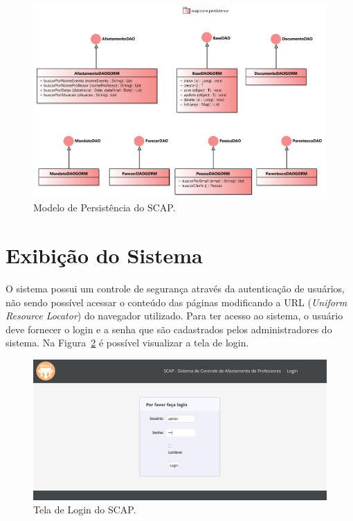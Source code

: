 \begin{figure}[!h]
	\centering
	\includegraphics[scale=0.45]{figuras/fig-projeto-persistencia} 
	\caption{Modelo de Persistência do SCAP.}
	\label{fig-projeto-persistencia}
\end{figure}

\section{Exibição do Sistema}
\label{sec-projeto-exibicao-sistema}

O sistema possui um controle de segurança através da autenticação de usuários, não sendo possível acessar o conteúdo das páginas modificando a URL (\textit{Uniform Resource Locator}) do navegador utilizado. Para ter acesso ao sistema, o usuário deve fornecer o login e a senha que são cadastrados pelos administradores do sistema. Na Figura~\ref{fig-projeto-login} é possível visualizar a tela de login.   

\begin{figure}[!h]
	\centering
	\includegraphics[scale=0.33]{figuras/fig-projeto-login} 
	\caption{Tela de Login do SCAP.}
	\label{fig-projeto-login}
\end{figure}

